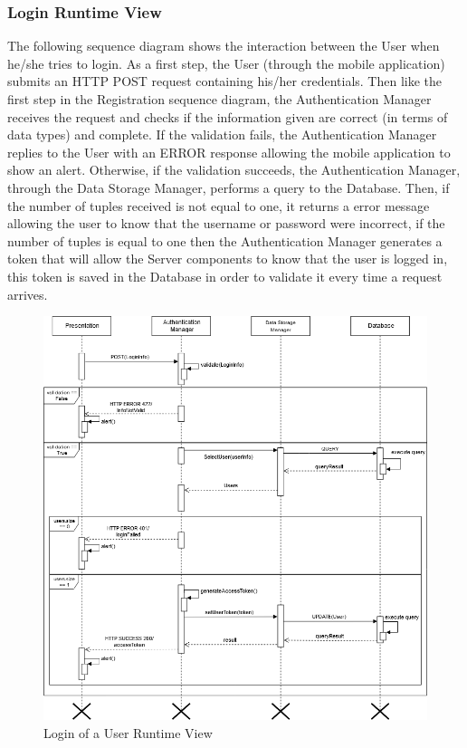 \subsubsection{Login Runtime View}
The following sequence diagram shows the interaction between the User when he/she tries to login.\newline
As a first step, the User (through the mobile application) submits an HTTP POST request containing his/her credentials. Then like the first step in the Registration sequence diagram, the Authentication Manager receives the request and checks if the information given are correct (in terms of data types) and complete.\newline
If the validation fails, the Authentication Manager replies to the User with an ERROR response allowing the mobile application to show an alert.\newline
Otherwise, if the validation succeeds, the Authentication Manager, through the Data Storage Manager, performs a query to the Database. Then, if the number of tuples received is not equal to one, it returns a error message allowing the user to know that the username or password were incorrect, if the number of tuples is equal to one then the Authentication Manager generates a token that will allow the Server components to know that the user is logged in, this token is saved in the Database in order to validate it every time a request arrives. 

\begin{figure}[H]
          \includegraphics[scale=0.5]{Images/seq_log_9.png}
        \caption{Login of a User Runtime View}
\end{figure}

